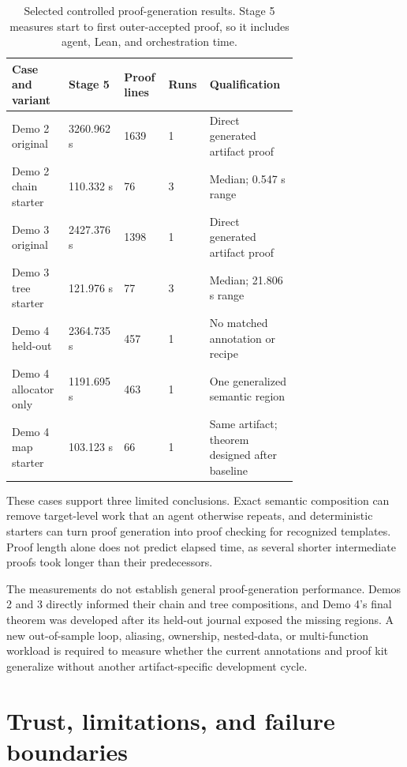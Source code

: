 \documentclass[11pt]{article}
\begin{document}
\begin{table}[ht]
\centering
\small
\setlength{\tabcolsep}{3.5pt}
\begin{tabular}{|L{0.15\linewidth}|L{0.11\linewidth}|L{0.10\linewidth}|L{0.07\linewidth}|L{0.29\linewidth}|}
\hline
Case and variant & Stage 5 & Proof lines & Runs & Qualification \\
\hline
Demo 2 original & 3260.962 s & 1639 & 1 & Direct generated artifact proof \\
Demo 2 chain starter & 110.332 s & 76 & 3 & Median; 0.547 s range \\
Demo 3 original & 2427.376 s & 1398 & 1 & Direct generated artifact proof \\
Demo 3 tree starter & 121.976 s & 77 & 3 & Median; 21.806 s range \\
Demo 4 held-out & 2364.735 s & 457 & 1 & No matched annotation or recipe \\
Demo 4 allocator only & 1191.695 s & 463 & 1 & One generalized semantic region \\
Demo 4 map starter & 103.123 s & 66 & 1 & Same artifact; theorem designed after baseline \\
\hline
\end{tabular}
\caption{Selected controlled proof-generation results.  Stage 5 measures start to first outer-accepted proof, so it includes agent, Lean, and orchestration time.}
\label{tab:timings}
\end{table}

These cases support three limited conclusions.  Exact semantic composition can remove target-level work that an agent otherwise repeats, and deterministic starters can turn proof generation into proof checking for recognized templates.  Proof length alone does not predict elapsed time, as several shorter intermediate proofs took longer than their predecessors.

The measurements do not establish general proof-generation performance.  Demos 2 and 3 directly informed their chain and tree compositions, and Demo 4's final theorem was developed after its held-out journal exposed the missing regions.  A new out-of-sample loop, aliasing, ownership, nested-data, or multi-function workload is required to measure whether the current annotations and proof kit generalize without another artifact-specific development cycle.

\section{Trust, limitations, and failure boundaries}
\label{sec:trust}
\end{document}
